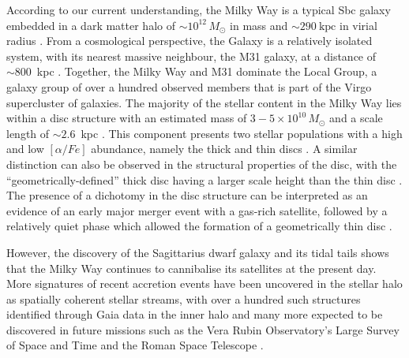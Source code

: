 According to our current understanding, the Milky Way is a typical Sbc galaxy \citep{Gerhard2002} embedded in a dark matter 
halo of $\sim 10^{12}\,M_\odot$ \citep{Posti2019,Watkins2019,Cautun2020} in mass and $\sim290~\mathrm{kpc}$ in virial radius \citep{Deason2020}.
From a cosmological perspective, the Galaxy is a relatively isolated system, with its nearest massive neighbour, 
the M31 galaxy, at a distance of $\sim 800$~kpc \citep{Preston2019}. Together, the Milky Way and M31 dominate the Local Group, 
a galaxy group of over a hundred observed members \citep{Karachentsev2013} that is part of the Virgo supercluster of galaxies. 
The majority of the stellar content in the Milky Way lies within a disc structure with an estimated mass of 
$3-5 \times 10^{10}\,M_\odot$ \citep{Licquia2016,Binney2024} and a scale length of $\sim 2.6$~kpc \citep{Licquia2016}. This component
presents two stellar populations with a high and low $[\alpha/Fe]$ abundance, namely the thick and thin discs 
\citep{Bensby2015,Nidever2014,Hayden2015,Kawata2016}. A similar distinction
can also be observed in the structural properties of the disc, with the ``geometrically-defined'' thick disc having 
a larger scale height than the thin disc \citep{Yoshii1982,Gilmore1983,Kawata2016}. The presence of a dichotomy in the disc structure can be 
interpreted as an evidence of an early major merger event with a gas-rich satellite, followed by a relatively quiet
phase which allowed the formation of a geometrically thin disc \citep{Brook2004,Grand2020}. 

However, the discovery of the Sagittarius dwarf galaxy and its tidal tails \citep{Ibata1994} shows that the Milky Way continues 
to cannibalise its satellites at the present day. More signatures of recent accretion events have been uncovered in the stellar halo as spatially coherent 
stellar streams, with over a hundred such structures identified through Gaia data in the inner halo \citep{Bonaca2025} and many more expected to be 
discovered in future missions such as the Vera Rubin Observatory’s Large Survey of Space and Time \citep{Ivezic2008} and the Roman Space Telescope 
\citep{Sanderson2019}.

